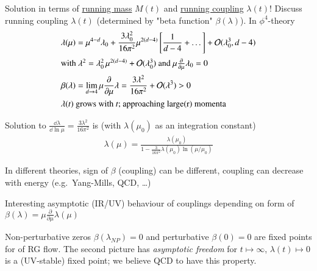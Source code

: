 Solution in terms of \underline{running mass} $M(t)$ and \underline{running coupling} $\lambda(t)$! Discuss running coupling $\lambda(t)$ (determined by "beta function" $\beta(\lambda)$). In $\phi^4$-theory
\begin{align}
   \lambda(\mu) &= \mu^{4-d} \lambda_0 + \frac{3\lambda_0^2}{16\pi^2} \mu^{2(d-4)} \left[ \frac{1}{d-4} + \dots \right] + \mathcal{O}(\lambda^3_0, d-4) \\
   \shortintertext{with $\lambda^2 = \lambda_0^2 \, \mu^{2(d-4)} + \mathcal{O}(\lambda_0^3)$ and $\mu \frac{\partial}{\partial \mu}\lambda_0 = 0$}
   \beta(\lambda) &= \lim_{d\rightarrow 4} \mu \frac{\partial }{\partial \mu}\lambda = \frac{3\lambda^2}{16\pi^2} + \mathcal{O}(\lambda^3) > 0 \\
   \shortintertext{$\lambda(t)$ grows with $t$; approaching large(r) momenta}
\end{align}

Solution to $\frac{\dd \lambda}{\dd \ln\mu} = \frac{3\lambda^2}{16\pi^2}$ is (with $\lambda(\mu_0)$ as an integration constant)
\begin{align}
   \lambda(\mu) = \frac{\lambda(\mu_0)}{1 - \frac{3}{16\pi^2}\lambda(\mu_0) \ln(\mu/\mu_0)} 
\end{align}

In different theories, sign of $\beta$ (coupling) can be different, coupling can decrease with energy (e.g.~Yang-Mills, QCD, \dots)

Interesting asymptotic (IR/UV) behaviour of couplings depending on form of $\beta(\lambda)=\mu \frac{\partial}{\partial \mu}\lambda(\mu)$

\begin{center}
\end{center}
Non-perturbative zeros $\beta(\lambda_{NP}) = 0$ and perturbative $\beta(0)=0$ are fixed points for of RG flow. The second picture has \textit{asymptotic freedom} for $t \longmapsto \infty$, $\lambda(t) \longmapsto 0$ is a (UV-stable) fixed point; we believe QCD to have this property.
